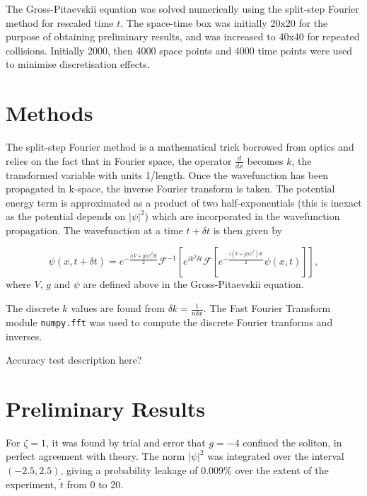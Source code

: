 \documentclass[10pt, twocolumn]{revtex4}    %
\begin{document}
The Gross-Pitaevskii equation was solved numerically using the split-step Fourier method for rescaled time $t$. The space-time box was initially 20x20 for the purpose of obtaining preliminary results, and was increased to 40x40 for repeated collisions. Initially 2000, then 4000 space points and 4000 time points were used to minimise discretisation effects. 


\section{Methods} \label{Methods}

The split-step Fourier method is a mathematical trick borrowed from optics and relies on the fact that in Fourier space, the operator $\frac{d}{dx}$ becomes $k$, the transformed variable with units 1/length. Once the wavefunction has been propagated in k-space, the inverse Fourier transform is taken. The potential energy term is approximated as a product of two half-exponentials (this is inexact as the potential depends on $|\psi|^2$) which are incorporated in the wavefunction propagation. The wavefunction at a time $t+\delta t$ is then given by

\begin{equation} \label{fft}
\psi(x,t+\delta t) = e^{-\frac{i(V+g|\psi|^2 \delta t}{2}} \mathcal{F}^{-1}[e^{ik^2 \delta t} \mathcal{F} [e^{- \frac{i(V+g|\psi|^2) \delta t}{2}} \psi(x,t) ] ],
\end{equation}
where $V$, $g$ and $\psi$ are defined above in the Gross-Pitaevskii equation. 

The discrete $k$ values are found from $\delta k = \frac{1}{n \delta x}$. The Fast Fourier Transform module \texttt{numpy.fft} was used to compute the discrete Fourier tranforms and inverses. 

Accuracy test description here?


\section{Preliminary Results} \label{Milestone}

 For $\zeta=1$, it was found by trial and error that $g=-4$ confined the soliton, in perfect agreement with theory. The norm $|\psi|^2$ was integrated over the interval $(-2.5,2.5)$, giving a probability leakage of 0.009\% over the extent of the experiment, $\tilde{t}$ from 0 to 20. 
\end{document}
